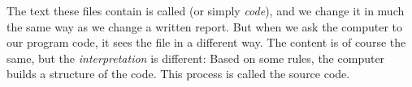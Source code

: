 The text these files contain is called \textsl{} (or simply \textsl{code}), and we change it in much the same way as we change a written report. But when we ask the computer to  our program code, it sees the file in a different way. The content is of course the same, but the \textsl{interpretation} is different: Based on some rules, the computer builds a  structure of the code. This process is called  the source code.





